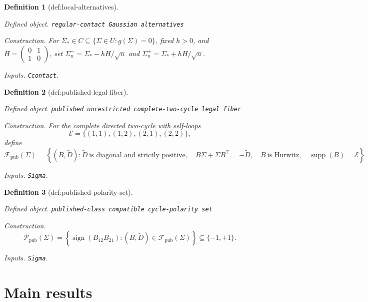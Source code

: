\documentclass{article}
\newtheorem{definition}{Definition}
\begin{document}
\begin{definition}[def:local-alternatives]\label{def:local-alternatives}
\par\smallskip\noindent\emph{Defined object.} \texttt{regular-\allowbreak{}contact Gaussian alternatives}
\par\smallskip\noindent\emph{Construction.} For \(\Sigma_*\in C\subseteq\{\Sigma\in U:g(\Sigma)=0\}\), fixed \(h>0\), and \(H=\begin{pmatrix}0&1\\1&0\end{pmatrix}\), set \(\Sigma_n^{-}=\Sigma_*-hH/\sqrt n\) and \(\Sigma_n^{+}=\Sigma_*+hH/\sqrt n\).
\par\smallskip\noindent\emph{Inputs.} \texttt{Ccontact}.
\end{definition}

\begin{definition}[def:published-legal-fiber]\label{def:published-legal-fiber}
\par\smallskip\noindent\emph{Defined object.} \texttt{published unrestricted complete-\allowbreak{}two-\allowbreak{}cycle legal fiber}
\par\smallskip\noindent\emph{Construction.} For the complete directed two-cycle with self-loops
\[
\mathcal E=\{(1,1),(1,2),(2,1),(2,2)\},
\]
define
\[
\mathcal F_{\mathrm{pub}}(\Sigma)
=\left\{(B,\widetilde D):
\widetilde D\ \text{is diagonal and strictly positive},\quad
B\Sigma+\Sigma B^{\top}=-\widetilde D,\quad
B\ \text{is Hurwitz},\quad
\operatorname{supp}(B)=\mathcal E
\right\}.
\]
\par\smallskip\noindent\emph{Inputs.} \texttt{Sigma}.
\end{definition}

\begin{definition}[def:published-polarity-set]\label{def:published-polarity-set}
\par\smallskip\noindent\emph{Defined object.} \texttt{published-\allowbreak{}class compatible cycle-\allowbreak{}polarity set}
\par\smallskip\noindent\emph{Construction.} \[
\mathcal P_{\mathrm{pub}}(\Sigma)
=\left\{\operatorname{sign}(B_{12}B_{21}):(B,\widetilde D)\in\mathcal F_{\mathrm{pub}}(\Sigma)\right\}
\subseteq\{-1,+1\}.
\]
\par\smallskip\noindent\emph{Inputs.} \texttt{Sigma}.
\end{definition}

\section{Main results}
\end{document}
